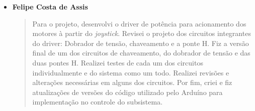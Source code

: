 \begin{itemize}
  \item \textbf{Felipe Costa de Assis}
    \begin{quote}
      Para o projeto, desenvolvi o driver de potência para acionamento dos motores
      à partir do \textit{joystick}. Revisei o projeto dos circuitos integrantes
      do driver: Dobrador de tensão, chaveamento e a ponte H. Fiz a versão final
      de um dos circuitos de chaveamento, do dobrador de tensão e das duas pontes
      H. Realizei testes de cada um dos circuitos individualmente e do sistema
      como um todo. Realizei revisões e alterações necessárias em alguns dos
      circuitos. Por fim, criei e fiz atualizações de versões do código utilizado
      pelo Arduíno para implementação no controle do subsistema.
    \end{quote}
\end{itemize}
